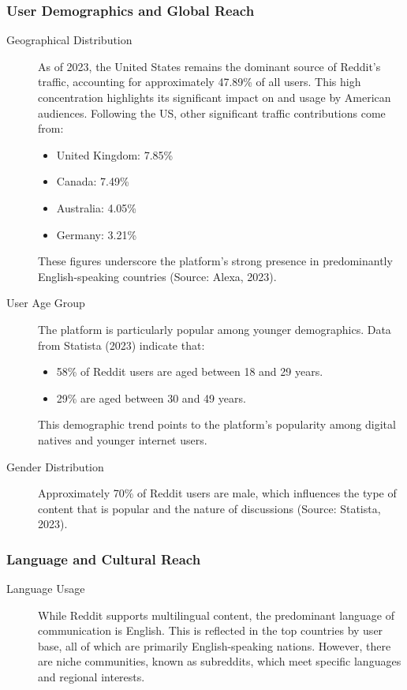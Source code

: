 \subsubsection{User Demographics and Global Reach}
\begin{description}
    \item[Geographical Distribution] As of 2023, the United States remains the dominant source of Reddit's traffic, accounting for approximately 47.89\% of all users. This high concentration highlights its significant impact on and usage by American audiences. Following the US, other significant traffic contributions come from:
    \begin{itemize}
        \item United Kingdom: 7.85\%
        \item Canada: 7.49\%
        \item Australia: 4.05\%
        \item Germany: 3.21\%
\end{itemize}
These figures underscore the platform's strong presence in predominantly English-speaking countries (Source: Alexa, 2023).

\item[User Age Group] The platform is particularly popular among younger demographics. Data from Statista (2023) indicate that:
\begin{itemize}
    \item 58\% of Reddit users are aged between 18 and 29 years.
    \item 29\% are aged between 30 and 49 years.
\end{itemize}
This demographic trend points to the platform's popularity among digital natives and younger internet users.

    \item[Gender Distribution] Approximately 70\% of Reddit users are male, which influences the type of content that is popular and the nature of discussions (Source: Statista, 2023).
\end{description}

\subsubsection{Language and Cultural Reach}
\begin{description}
    \item[Language Usage] While Reddit supports multilingual content, the predominant language of communication is English. This is reflected in the top countries by user base, all of which are primarily English-speaking nations. However, there are niche communities, known as subreddits, which meet specific languages and regional interests.
\end{description}

